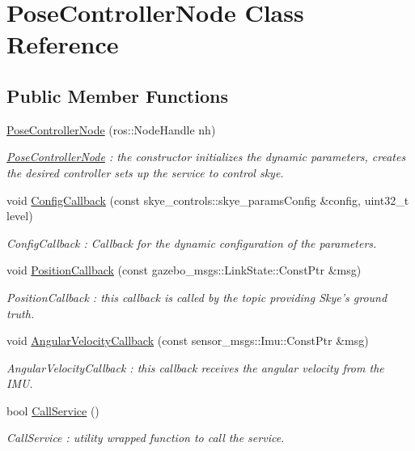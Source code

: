\hypertarget{class_pose_controller_node}{\section{Pose\-Controller\-Node Class Reference}
\label{class_pose_controller_node}
}
\subsection*{Public Member Functions}
\begin{DoxyCompactItemize}
\item 
\hyperlink{class_pose_controller_node_a17466a8314ad354402401ba27157594c}{Pose\-Controller\-Node} (ros\-::\-Node\-Handle nh)
\begin{DoxyCompactList}\small\item\em \hyperlink{class_pose_controller_node}{Pose\-Controller\-Node} \-: the constructor initializes the dynamic parameters, creates the desired controller sets up the service to control skye. \end{DoxyCompactList}\item 
void \hyperlink{class_pose_controller_node_aab9762d618a38b99cbfbcaecd2163606}{Config\-Callback} (const skye\-\_\-controls\-::skye\-\_\-params\-Config \&config, uint32\-\_\-t level)
\begin{DoxyCompactList}\small\item\em Config\-Callback \-: Callback for the dynamic configuration of the parameters. \end{DoxyCompactList}\item 
void \hyperlink{class_pose_controller_node_ac4582290cf6ff6b5cd9564fd386c3b39}{Position\-Callback} (const gazebo\-\_\-msgs\-::\-Link\-State\-::\-Const\-Ptr \&msg)
\begin{DoxyCompactList}\small\item\em Position\-Callback \-: this callback is called by the topic providing Skye's ground truth. \end{DoxyCompactList}\item 
void \hyperlink{class_pose_controller_node_a1804624b5c2f57b08fcd1c50b8118cd7}{Angular\-Velocity\-Callback} (const sensor\-\_\-msgs\-::\-Imu\-::\-Const\-Ptr \&msg)
\begin{DoxyCompactList}\small\item\em Angular\-Velocity\-Callback \-: this callback receives the angular velocity from the I\-M\-U. \end{DoxyCompactList}\item 
bool \hyperlink{class_pose_controller_node_a0b12265a62dad33caa6063f5cb582c80}{Call\-Service} ()
\begin{DoxyCompactList}\small\item\em Call\-Service \-: utility wrapped function to call the service. \end{DoxyCompactList}\end{DoxyCompactItemize}
